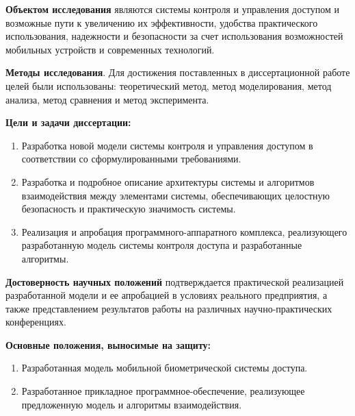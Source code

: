 \medskip

\textbf{Объектом исследования} являются системы контроля и управления доступом и возможные пути к увеличению их эффективности, удобства практического использования, надежности и безопасности за счет использования возможностей мобильных устройств и современных технологий.

\medskip

\textbf{Методы исследования}. Для достижения поставленных в диссертационной
работе целей были использованы: теоретический метод, метод моделирования, метод анализа, метод сравнения и метод эксперимента. 

\medskip

\textbf{Цели и задачи диссертации:}
\begin{enumerate}
  \item Разработка новой модели системы контроля и управления доступом в соответствии со сформулированными требованиями.
 
  \item Разработка и подробное описание архитектуры системы и алгоритмов взаимодействия между элементами системы, обеспечивающих целостную безопасность и практическую значимость системы.

  \item Реализация и апробация программного-аппаратного комплекса, реализующего разработанную модель системы контроля доступа и разработанные алгоритмы.
\end{enumerate}

\medskip

\textbf{Достоверность научных положений} подтверждается практической реализацией разработанной модели и ее апробацией в условиях реального предприятия, а также представлением результатов работы на различных научно-практических конференциях.

\bigskip
\bigskip
\bigskip

\textbf{Основные положения, выносимые на защиту:}
\begin{enumerate}
  \item Разработанная модель мобильной биометрической системы доступа.
  \item Разработанное прикладное программное-обеспечение, реализующее предложенную модель и алгоритмы взаимодействия.
\end{enumerate}

\medskip

